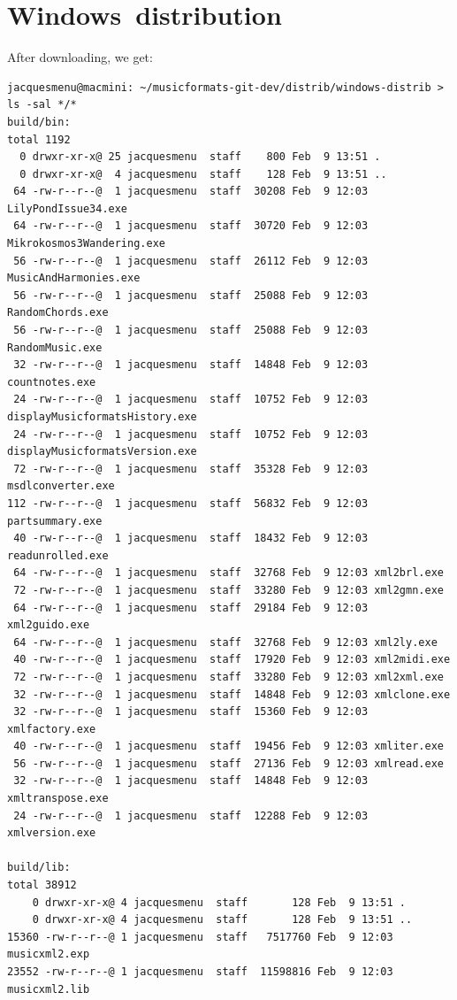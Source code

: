 \section{Windows\texttrademark\ distribution}

After downloading, we get:
\begin{lstlisting}[language=Terminal]
jacquesmenu@macmini: ~/musicformats-git-dev/distrib/windows-distrib > ls -sal */*
build/bin:
total 1192
  0 drwxr-xr-x@ 25 jacquesmenu  staff    800 Feb  9 13:51 .
  0 drwxr-xr-x@  4 jacquesmenu  staff    128 Feb  9 13:51 ..
 64 -rw-r--r--@  1 jacquesmenu  staff  30208 Feb  9 12:03 LilyPondIssue34.exe
 64 -rw-r--r--@  1 jacquesmenu  staff  30720 Feb  9 12:03 Mikrokosmos3Wandering.exe
 56 -rw-r--r--@  1 jacquesmenu  staff  26112 Feb  9 12:03 MusicAndHarmonies.exe
 56 -rw-r--r--@  1 jacquesmenu  staff  25088 Feb  9 12:03 RandomChords.exe
 56 -rw-r--r--@  1 jacquesmenu  staff  25088 Feb  9 12:03 RandomMusic.exe
 32 -rw-r--r--@  1 jacquesmenu  staff  14848 Feb  9 12:03 countnotes.exe
 24 -rw-r--r--@  1 jacquesmenu  staff  10752 Feb  9 12:03 displayMusicformatsHistory.exe
 24 -rw-r--r--@  1 jacquesmenu  staff  10752 Feb  9 12:03 displayMusicformatsVersion.exe
 72 -rw-r--r--@  1 jacquesmenu  staff  35328 Feb  9 12:03 msdlconverter.exe
112 -rw-r--r--@  1 jacquesmenu  staff  56832 Feb  9 12:03 partsummary.exe
 40 -rw-r--r--@  1 jacquesmenu  staff  18432 Feb  9 12:03 readunrolled.exe
 64 -rw-r--r--@  1 jacquesmenu  staff  32768 Feb  9 12:03 xml2brl.exe
 72 -rw-r--r--@  1 jacquesmenu  staff  33280 Feb  9 12:03 xml2gmn.exe
 64 -rw-r--r--@  1 jacquesmenu  staff  29184 Feb  9 12:03 xml2guido.exe
 64 -rw-r--r--@  1 jacquesmenu  staff  32768 Feb  9 12:03 xml2ly.exe
 40 -rw-r--r--@  1 jacquesmenu  staff  17920 Feb  9 12:03 xml2midi.exe
 72 -rw-r--r--@  1 jacquesmenu  staff  33280 Feb  9 12:03 xml2xml.exe
 32 -rw-r--r--@  1 jacquesmenu  staff  14848 Feb  9 12:03 xmlclone.exe
 32 -rw-r--r--@  1 jacquesmenu  staff  15360 Feb  9 12:03 xmlfactory.exe
 40 -rw-r--r--@  1 jacquesmenu  staff  19456 Feb  9 12:03 xmliter.exe
 56 -rw-r--r--@  1 jacquesmenu  staff  27136 Feb  9 12:03 xmlread.exe
 32 -rw-r--r--@  1 jacquesmenu  staff  14848 Feb  9 12:03 xmltranspose.exe
 24 -rw-r--r--@  1 jacquesmenu  staff  12288 Feb  9 12:03 xmlversion.exe

build/lib:
total 38912
    0 drwxr-xr-x@ 4 jacquesmenu  staff       128 Feb  9 13:51 .
    0 drwxr-xr-x@ 4 jacquesmenu  staff       128 Feb  9 13:51 ..
15360 -rw-r--r--@ 1 jacquesmenu  staff   7517760 Feb  9 12:03 musicxml2.exp
23552 -rw-r--r--@ 1 jacquesmenu  staff  11598816 Feb  9 12:03 musicxml2.lib


\end{lstlisting}
